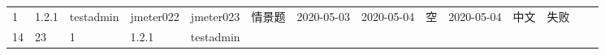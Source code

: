 \documentclass[hyperref, a4paper]{ctexart}
\begin{document}
\begin{longtable}[]{@{}llllllllllllll@{}}
\begin{minipage}[t]{0.03\columnwidth}
1\strut
\end{minipage} & \begin{minipage}[t]{0.06\columnwidth}\raggedright
1.2.1\strut
\end{minipage} & \begin{minipage}[t]{0.04\columnwidth}\raggedright
testadmin\strut
\end{minipage} & \begin{minipage}[t]{0.04\columnwidth}\raggedright
jmeter022\strut
\end{minipage} & \begin{minipage}[t]{0.04\columnwidth}\raggedright
jmeter023\strut
\end{minipage} & \begin{minipage}[t]{0.02\columnwidth}\raggedright
情景题\strut
\end{minipage} & \begin{minipage}[t]{0.04\columnwidth}\raggedright
2020-05-03\strut
\end{minipage} & \begin{minipage}[t]{0.05\columnwidth}\raggedright
2020-05-04\strut
\end{minipage} & \begin{minipage}[t]{0.07\columnwidth}\raggedright
空\strut
\end{minipage} & \begin{minipage}[t]{0.08\columnwidth}\raggedright
2020-05-04\strut
\end{minipage} & \begin{minipage}[t]{0.04\columnwidth}\raggedright
中文\strut
\end{minipage} & \begin{minipage}[t]{0.02\columnwidth}\raggedright
失败\strut
\end{minipage}\tabularnewline
\begin{minipage}[t]{0.01\columnwidth}\raggedright
14\strut
\end{minipage} & \begin{minipage}[t]{0.12\columnwidth}\raggedright
23\strut
\end{minipage} & \begin{minipage}[t]{0.03\columnwidth}\raggedright
1\strut
\end{minipage} & \begin{minipage}[t]{0.06\columnwidth}\raggedright
1.2.1\strut
\end{minipage} & \begin{minipage}[t]{0.04\columnwidth}\raggedright
testadmin\strut
\end{minipage} & \begin{minipage}[t]{0.04\columnwidth}\raggedright

\end{minipage}
\end{longtable}
\end{document}
